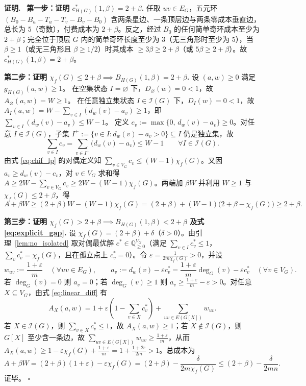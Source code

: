 \documentclass[11pt,a4paper]{ctexart}
\theoremstyle{definition}
\newenvironment{proofcn}{\par\noindent\textbf{证明.}\ }{\hfill$\square$\par}
\newcommand{\Ind}{\mathcal I}
\newcommand{\QQ}{\mathbb Q}
\newcommand{\1}{\boldsymbol 1}
\newcommand{\0}{\boldsymbol 0}
\newcommand{\chif}{\chi_f}
\begin{document}
\begin{proofcn}
\textbf{第一步：证明 $c_{H(G)}^*(1,\beta)=2+\beta$.}
任取 $uv\in E_G$，五元环 $(B_0-B_u-T_u-T_v-B_v-B_0)$ 含两条星边、一条顶层边与两条零成本垂直边，总长为 $5$（奇数），付费成本为 $2+\beta$。反之，经过 $B_0$ 的任何简单奇环成本至少为 $2+\beta$；完全位于顶层 $G$ 内的简单奇环长度至少为 $3$（无三角形时至少为 $5$），当 $\beta\ge 1$（或无三角形且 $\beta\ge 1/2$）时其成本 $\ge 3\beta\ge 2+\beta$（或 $5\beta\ge 2+\beta$）。故 $c_{H(G)}^*(1,\beta)=2+\beta$。

\medskip
\noindent\textbf{第二步：证明 $\chif(G)\le 2+\beta \implies B_{H(G)}(1,\beta)=2+\beta$.}
设 $(a,w)\ge 0$ 满足 $g_{H(G)}(a,w)\ge 1$。
在空集状态 $I=\varnothing$ 下，$D_\varnothing(w)=0<1$，故 $A_\varnothing(a,w)=W\ge 1$。
在任意独立集状态 $I\in\Ind(G)$ 下，$D_I(w)=0<1$，故 $A_I(a,w)=W-\sum_{v\in I}(d_w(v)-a_v)\ge 1$，即 $\sum_{v\in I}(d_w(v)-a_v)\le W-1$。
定义 $c_v:=\max\{0,\,d_w(v)-a_v\}\ge 0$。对任意 $I\in\Ind(G)$，子集 $I^+:=\{v\in I:d_w(v)-a_v>0\}\subseteq I$ 仍是独立集，故
\[
 \sum_{v\in I}c_v = \sum_{v\in I^+}\bigl(d_w(v)-a_v\bigr) \le W-1\qquad \forall I\in\Ind(G).
\]
由式 \eqref{eq:chif_lp} 的对偶定义知 $\sum_{v\in V_G}c_v \le (W-1)\chif(G)$。又因 $a_v\ge d_w(v)-c_v$，对 $v\in V_G$ 求和得 $A\ge 2W-\sum_{v\in V_G}c_v\ge 2W-(W-1)\chif(G)$。两端加 $\beta W$ 并利用 $W\ge 1$ 与 $\chif(G)\le 2+\beta$，得
\[
 A + \beta W \ge (2+\beta)W - (W-1)\chif(G) = (2+\beta) + (W-1)\bigl(2+\beta-\chif(G)\bigr) \ge 2+\beta.
\]

\medskip
\noindent\textbf{第三步：证明 $\chif(G)>2+\beta \implies B_{H(G)}(1,\beta)<2+\beta$ 及式 \eqref{eq:explicit_gap}.}
设 $\chif(G)=(2+\beta)+\delta$（$\delta>0$）。由引理~\ref{lem:no_isolated} 取对偶最优解 $c^*\in\QQ_{\ge 0}^{V_G}$（满足 $\sum_{v\in I}c_v^*\le 1$，$\sum_{v}c_v^*=\chif(G)$，且在孤立点上 $c_v^*=0$）。令 $\varepsilon=\frac{1}{2m\chif(G)}>0$，并设
\[
 w_{uv} := \frac{1+\varepsilon}{m}\quad (\forall uv\in E_G),\qquad
 a_v := d_w(v) - \varepsilon c_v^* = \frac{1+\varepsilon}{m}\deg_G(v) - \varepsilon c_v^*\quad (\forall v\in V_G).
\]
若 $\deg_G(v)=0$ 则 $a_v=0$；若 $\deg_G(v)\ge 1$ 则 $a_v\ge \frac{1+\varepsilon}{m}-\varepsilon > 0$。对任意 $X\subseteq V_G$，由式 \eqref{eq:linear_diff} 有
\[
 A_X(a,w) = 1 + \varepsilon\left(1 - \sum_{v\in X}c_v^*\right) + \sum_{uv\in E(G[X])}w_{uv}.
\]
若 $X\in\Ind(G)$，则 $\sum_{v\in X}c_v^*\le 1$，故 $A_X(a,w)\ge 1$；若 $X\notin\Ind(G)$，则 $G[X]$ 至少含一条边，故 $\sum_{uv\in E(G[X])}w_{uv}\ge \frac{1+\varepsilon}{m}$，从而 $A_X(a,w)\ge 1-\varepsilon\chif(G)+\frac{1+\varepsilon}{m}=1+\frac{1+2\varepsilon}{2m}>1$。总成本为
\[
 A + \beta W = (2+\beta)(1+\varepsilon) - \varepsilon\chif(G) = (2+\beta) - \frac{\delta}{2m\chif(G)} \le (2+\beta) - \frac{\delta}{2mn}.
\]
证毕。
\end{proofcn}
\end{document}
